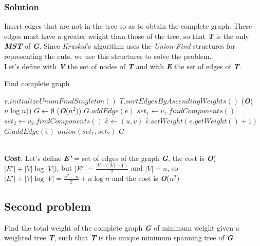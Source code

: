 \documentclass[11pt]{article}
\begin{document}
\subsubsection*{Solution}
Insert edges that are not in the tree so as to obtain the complete graph. These edges must have a greater weight than those of the tree, so that \textbf{\textit{T}} is the only \textbf{\textit{MST}} of \textbf{\textit{G}}. Since \textit{Kruskal}'s algorithm uses the \textit{Union-Find} structures for representing the cuts, we use this structures to solve the problem. \\
Let's define with \textbf{\textit{V}} the set of nodes of \textbf{\textit{T}} and with \textbf{\textit{E}} the set of edges of \textbf{\textit{T}}.
\begin{algorithm}
	\caption{Find complete graph}\label{euclid}
	\begin{algorithmic}[1]
			\State $v.initializeUnionFindSingleton()$
		\EndFor
		\State $T.sortEdgesByAscendingWeights()$ \qquad \qquad \qquad \qquad \qquad \qquad \qquad (\textbf{\textit{O}}($n\log{n}$))
		\State $G \gets \emptyset$
		 \qquad \qquad \qquad \qquad \qquad \qquad \qquad \qquad \qquad \qquad (\textbf{\textit{O}}($n^2$))
			\State  $G.addEdge(e)$
			\State  $set_1 \gets v_1.findComponents()$
			\State  $set_2 \gets v_2.findComponents()$
					\State $\hat{e} \gets (u, v)$
						\State $\hat{e}.setWeight(e.getWeight() + 1)$
						\State $G.addEdge(\hat{e})$
					\EndIf
				\EndFor
			\EndFor
			\State $union(set_1, set_2)$
		\EndFor
		\State \Return $G$
	\end{algorithmic}
\end{algorithm} \\
\textbf{Cost}: Let's define \textbf{\textit{E'}} = set of edges of the graph \textbf{\textit{G}}, the cost is \textbf{\textit{O}}($|E'| + |V|\log{|V|}$), but $|E'| = \frac{|V| \cdot (|V| - 1)}{2}$ and $|V| = n$, so $|E'| + |V|\log{|V|} = \frac{n^2 - n}{2} + n\log{n}$ and the cost is \textbf{\textit{O}}($n^2$)
\subsection*{Second problem}
Find the total weight of the complete graph \textbf{\textit{G}} of minimum weight given a weighted tree \textbf{\textit{T}}, such that  \textbf{\textit{T}} is the unique minimum spanning tree of \textbf{\textit{G}}.
\end{document}
